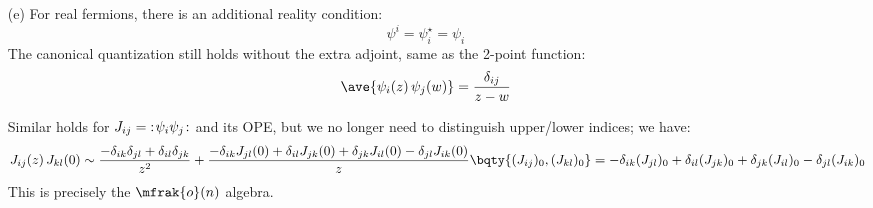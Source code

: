 \documentclass[a4paper,10pt]{article}
\begin{document}
\begin{enumerate}
\begin{enumerate}
	\item[(e)] For real fermions, there is an additional reality condition:
	\begin{equation}
		\psi^i = \psi^\star_i = \psi_i 
	\end{equation}
	The canonical quantization still holds without the extra adjoint, same as the 2-point function:
	\begin{equation}
		\ave{\psi_i(z)\,\psi_j(w)}
		= \frac{\delta_{ij}}{z - w}
	\end{equation}
	
	Similar holds for $J_{ij} = {\mathopen {:}}{{\hskip .1em} \psi_i\psi_j{\hskip .1em}}{\mathclose {:}}$ and its OPE, but we no longer need to distinguish upper/lower indices; we have:
	\begin{equation}
		J_{ij}(z)\,J_{kl}(0)
		\sim \frac{
			- \delta_{ik}\delta_{jl}
			+ \delta_{il}\delta_{jk}
		}{z^2} + \frac{
			- \delta_{ik} J_{jl}(0)
			+ \delta_{il} J_{jk}(0)
			+ \delta_{jk} J_{il}(0)
			- \delta_{jl} J_{ik}(0)
		}{z}\\[1ex]
		\bqty{
			(J_{ij})_0, (J_{kl})_0
		}
		= - \delta_{ik} (J_{jl})_0
			+ \delta_{il} (J_{jk})_0
			+ \delta_{jk} (J_{il})_0
			- \delta_{jl} (J_{ik})_0
	\end{equation}
	This is precisely the $\mfrak{o}(n)$ algebra. 
	\qedfull
	
	\end{enumerate}
	
	
	\end{enumerate}


\printbibliography[%
	,heading = bibintoc
]
\end{document}
